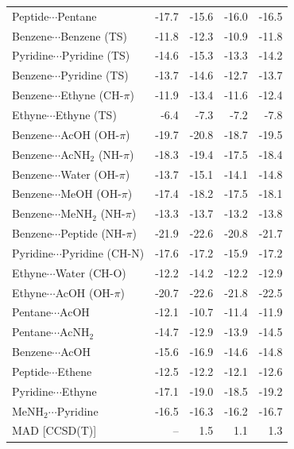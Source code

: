 \begin{longtable}{lrrrr}
Peptide$\cdots$Pentane & -17.7 & -15.6 & -16.0 & -16.5 \\
Benzene$\cdots$Benzene (TS) & -11.8 & -12.3 & -10.9 & -11.8 \\
Pyridine$\cdots$Pyridine (TS) & -14.6 & -15.3 & -13.3 & -14.2 \\
Benzene$\cdots$Pyridine (TS) & -13.7 & -14.6 & -12.7 & -13.7 \\
Benzene$\cdots$Ethyne (CH-$\pi$) & -11.9 & -13.4 & -11.6 & -12.4 \\
Ethyne$\cdots$Ethyne (TS) & -6.4 & -7.3 & -7.2 & -7.8 \\
Benzene$\cdots$AcOH (OH-$\pi$) & -19.7 & -20.8 & -18.7 & -19.5 \\
Benzene$\cdots$AcNH$_2$ (NH-$\pi$) & -18.3 & -19.4 & -17.5 & -18.4 \\
Benzene$\cdots$Water (OH-$\pi$) & -13.7 & -15.1 & -14.1 & -14.8 \\
Benzene$\cdots$MeOH (OH-$\pi$) & -17.4 & -18.2 & -17.5 & -18.1 \\
Benzene$\cdots$MeNH$_2$ (NH-$\pi$) & -13.3 & -13.7 & -13.2 & -13.8 \\
Benzene$\cdots$Peptide (NH-$\pi$) & -21.9 & -22.6 & -20.8 & -21.7 \\
Pyridine$\cdots$Pyridine (CH-N) & -17.6 & -17.2 & -15.9 & -17.2 \\
Ethyne$\cdots$Water (CH-O) & -12.2 & -14.2 & -12.2 & -12.9 \\
Ethyne$\cdots$AcOH (OH-$\pi$) & -20.7 & -22.6 & -21.8 & -22.5 \\
Pentane$\cdots$AcOH & -12.1 & -10.7 & -11.4 & -11.9 \\
Pentane$\cdots$AcNH$_2$ & -14.7 & -12.9 & -13.9 & -14.5 \\
Benzene$\cdots$AcOH & -15.6 & -16.9 & -14.6 & -14.8 \\
Peptide$\cdots$Ethene & -12.5 & -12.2 & -12.1 & -12.6 \\
Pyridine$\cdots$Ethyne & -17.1 & -19.0 & -18.5 & -19.2 \\
MeNH$_2$$\cdots$Pyridine & -16.5 & -16.3 & -16.2 & -16.7 \\
MAD [CCSD(T)] & -- & 1.5 & 1.1 & 1.3 \\
\bottomrule


\end{longtable}